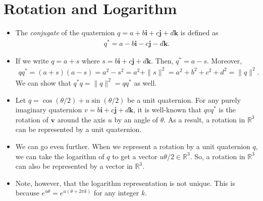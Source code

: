 \documentclass[10pt]{article}
\newcommand{\ve}[1]{\mathbf{#1}}
\newcommand{\Real}{\mathbb{R}}
\begin{document}
\section{Rotation and Logarithm}

\begin{itemize}
    \item The \emph{conjugate} of the quaternion $q = a + b\ve{i} + c\ve{j} + d\ve{k}$ is defined as
    \begin{align*}
        q^* = a - b\ve{i} - c\ve{j} - d\ve{k}.
    \end{align*}
    
    \item If we write $q = a + s$ where $s = b\ve{i} + c\ve{j} + d\ve{k}$. Then, $q^* = a - s$. Moreover,
    \begin{align*}
        qq^* = (a + s)(a - s) = a^2 - s^2 = a^2 + \| s \|^2 = a^2 + b^2 + c^2 + d^2 = \|q\|^2.
    \end{align*}
    We can show that $q^*q = \| q \|^2 = qq^*$ as well.

    \item Let $q = \cos (\theta/2) + u \sin (\theta/2)$ be a unit quaternion. For any purely imaginary quaternion $v = b \ve{i} + c \ve{j} + d \ve{k}$, it is well-known that $qvq^*$ is the rotation of $\ve{v}$ around the axis $u$ by an angle of $\theta$. As a result, a rotation in $\Real^3$ can be represented by a unit quaternion.
    
    \item We can go even further. When we represent a rotation by a unit quaternion $q$, we can take the logarithm of $q$ to get a vector $u \theta/2 \in \Real^3$. So, a rotation in $\Real^3$ can also be represented by a vector in $\Real^3$.
    
    \item Note, however, that the logarithm representation is not unique. This is because $e^{u\theta} = e^{u(\theta + 2\pi k)}$ for any integer $k$.
\end{itemize}



  
\end{document}
